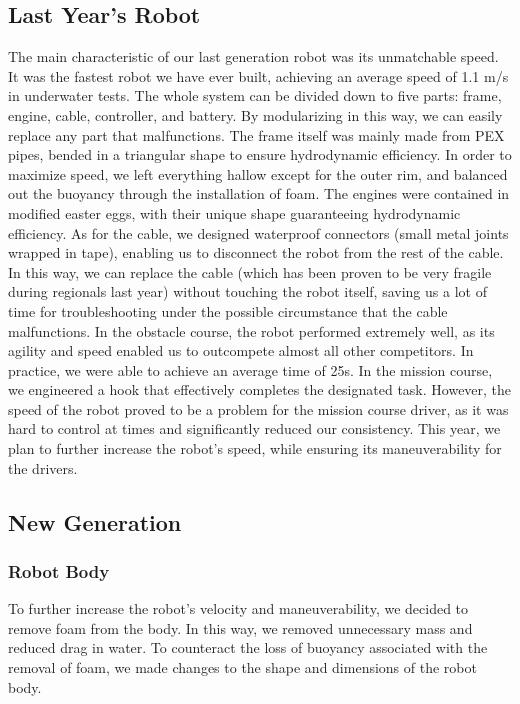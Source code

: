 \documentclass[11pt, oneside]{article}   	%
\begin{document}
\subsection{Last Year's Robot}
	The main characteristic of our last generation robot was its unmatchable speed. It was the fastest robot we have ever built, achieving an average speed of 1.1 m/s in underwater tests. The whole system can be divided down to five parts: frame, engine, cable, controller, and battery. By modularizing in this way, we can easily replace any part that malfunctions. The frame itself was mainly made from PEX pipes, bended in a triangular shape to ensure hydrodynamic efficiency. In order to maximize speed, we left everything hallow except for the outer rim, and balanced out the buoyancy through the installation of foam. The engines were contained in modified easter eggs, with their unique shape guaranteeing hydrodynamic efficiency. As for the cable, we designed waterproof connectors (small metal joints wrapped in tape), enabling us to disconnect the robot from the rest of the cable. In this way, we can replace the cable (which has been proven to be very fragile during regionals last year) without touching the robot itself, saving us a lot of time for troubleshooting under the possible circumstance that the cable malfunctions.
	In the obstacle course, the robot performed extremely well, as its agility and speed enabled us to outcompete almost all other competitors. In practice, we were able to achieve an average time of 25s. In the mission course, we engineered a hook that effectively completes the designated task. However, the speed of the robot proved to be a problem for the mission course driver, as it was hard to control at times and significantly reduced our consistency. This year, we plan to further increase the robot’s speed, while ensuring its maneuverability for the drivers.

\subsection{New Generation}
\subsubsection*{Robot Body}
	To further increase the robot's velocity and maneuverability, we decided to remove foam from the body. In this way, we removed unnecessary mass and reduced drag in water. To counteract the loss of buoyancy associated with the removal of foam, we made changes to the shape and dimensions of the robot body.
\end{document}
